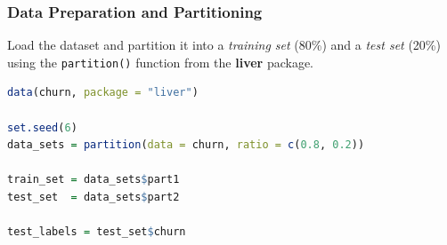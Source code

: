 \documentclass[
  11pt,
]{book}
\newcommand{\passthrough}[1]{#1}
\theoremstyle{definition}
\theoremstyle{definition}
\theoremstyle{definition}
\theoremstyle{definition}
\theoremstyle{remark}
\begin{document}
\subsubsection{Data Preparation and Partitioning}\label{data-preparation-and-partitioning}

Load the dataset and partition it into a \emph{training set} (80\%) and a \emph{test set} (20\%) using the \passthrough{\lstinline!partition()!} function from the \textbf{liver} package.

\begin{lstlisting}[language=R]
data(churn, package = "liver")

set.seed(6)
data_sets = partition(data = churn, ratio = c(0.8, 0.2))

train_set = data_sets$part1
test_set  = data_sets$part2

test_labels = test_set$churn
\end{lstlisting}
\end{document}
